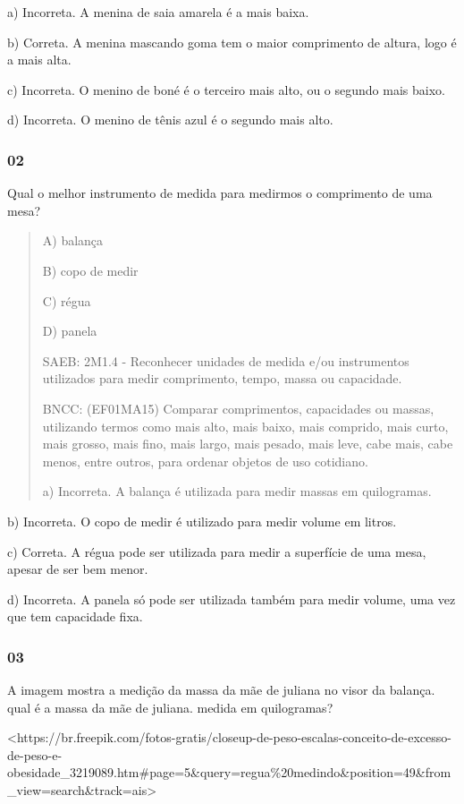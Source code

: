 a) Incorreta. A menina de saia amarela é a mais baixa.

b) Correta. A menina mascando goma tem o maior comprimento de altura,
logo é a mais alta.

c) Incorreta. O menino de boné é o terceiro mais alto, ou o segundo mais
baixo.

d) Incorreta. O menino de tênis azul é o segundo mais alto.

\subsubsection{02}\label{section-37}

Qual o melhor instrumento de medida para medirmos o comprimento de uma
mesa?

\begin{quote}
A) balança

B) copo de medir

C) régua

D) panela

SAEB: 2M1.4 - Reconhecer unidades de medida e/ou instrumentos utilizados
para medir comprimento, tempo, massa ou capacidade.

BNCC: (EF01MA15) Comparar comprimentos, capacidades ou massas,
utilizando termos como mais alto, mais baixo, mais comprido, mais curto,
mais grosso, mais fino, mais largo, mais pesado, mais leve, cabe mais,
cabe menos, entre outros, para ordenar objetos de uso cotidiano.

a) Incorreta. A balança é utilizada para medir massas em quilogramas.
\end{quote}

b) Incorreta. O copo de medir é utilizado para medir volume em litros.

c) Correta. A régua pode ser utilizada para medir a superfície de uma
mesa, apesar de ser bem menor.

d) Incorreta. A panela só pode ser utilizada também para medir volume,
uma vez que tem capacidade fixa.

\subsubsection{03}\label{section-38}

A imagem mostra a medição da massa da mãe de juliana no visor da
balança. qual é a massa da mãe de juliana. medida em quilogramas?

\textless{}https://br.freepik.com/fotos-gratis/closeup-de-peso-escalas-conceito-de-excesso-de-peso-e-obesidade\_3219089.htm\#page=5\&query=regua\%20medindo\&position=49\&from\_view=search\&track=ais\textgreater{}

